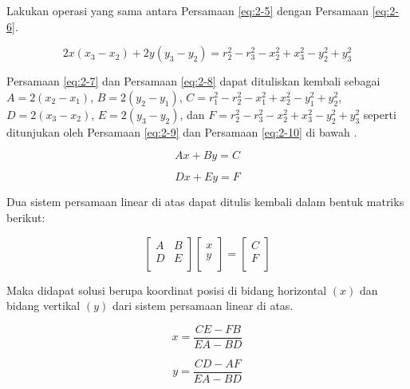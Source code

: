 Lakukan operasi yang sama antara Persamaan  \ref{eq:2-5} dengan Persamaan \ref{eq:2-6}.

\begin{equation}
	2x \left(x_3 -x_2\right) + 2y \left(y_3 - y_2\right) = r_2^2 - r_3^2 - x_2^2 + x_3^2- y_2^2 + y_3^2
	\label{eq:2-8}
\end{equation}

Persamaan \ref{eq:2-7} dan Persamaan \ref{eq:2-8} dapat dituliskan kembali sebagai $A = 2 \left(x_2-x_1\right)$, $B = 2 \left(y_2 - y_1\right)$, $C = r_1^2 - r_2^2 - x_1^2 + x_2^2- y_1^2 + y_2^2$, $D = 2 \left(x_3 -x_2\right)$, $E = 2 \left(y_3 - y_2\right) $, dan $F= r_2^2 - r_3^2 - x_2^2 + x_3^2- y_2^2 + y_3^2$ seperti ditunjukan oleh Persamaan \ref{eq:2-9} dan Persamaan \ref{eq:2-10} di bawah .

\begin{equation}
	Ax + By = C
	\label{eq:2-9}
\end{equation}

\begin{equation}
	Dx + Ey = F
	\label{eq:2-10}
\end{equation}

Dua sistem persamaan linear di atas dapat ditulis kembali dalam bentuk matriks berikut:

\begin{equation}
	\begin{bmatrix}
		A & B \\
		D & E \\
	\end{bmatrix}
	\begin{bmatrix}
		x \\
		y\\
	\end{bmatrix} = 
	\begin{bmatrix}
		C \\
		F \\
	\end{bmatrix}
	\label{eq:2-11}
\end{equation}

Maka didapat solusi berupa koordinat posisi di bidang horizontal $\left(x\right)$ dan bidang vertikal $\left(y\right)$ dari sistem persamaan linear di atas.

\begin{equation}
	x = \frac{CE-FB}{EA-BD}
	\label{eq:2-12}
\end{equation}

\begin{equation}
	y = \frac{CD-AF}{EA-BD}
	\label{eq:2-13}
\end{equation}


